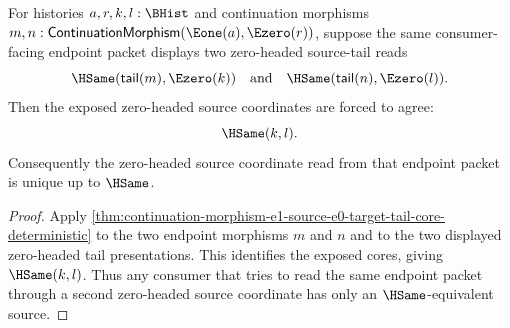 \begin{corollary}
\label{cor:continuation-morphism-e1-source-e0-target-zero-tail-consumer-determinacy}
For histories $a,r,k,l:\BHist$ and continuation morphisms
$m,n:\mathsf{ContinuationMorphism}(\Eone(a),\Ezero(r))$, suppose the same
consumer-facing endpoint packet displays two zero-headed source-tail reads
$$
\HSame(\mathsf{tail}(m),\Ezero(k))
\quad\text{and}\quad
\HSame(\mathsf{tail}(n),\Ezero(l)).
$$
Then the exposed zero-headed source coordinates are forced to agree:
$$
\HSame(k,l).
$$
Consequently the zero-headed source coordinate read from that endpoint packet
is unique up to $\HSame$.
\end{corollary}
\begin{proof}
Apply
\autoref{thm:continuation-morphism-e1-source-e0-target-tail-core-deterministic}
to the two endpoint morphisms $m$ and $n$ and to the two displayed zero-headed
tail presentations. This identifies the exposed cores, giving $\HSame(k,l)$.
Thus any consumer that tries to read the same endpoint packet through a second
zero-headed source coordinate has only an $\HSame$-equivalent source.
\end{proof}
